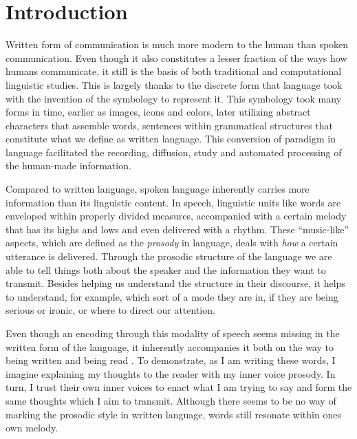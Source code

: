\chapter{Introduction}
\label{chapter:intro}

Written form of communication is much more modern to the human than spoken communication. Even though it also constitutes a lesser fraction of the ways how humans communicate, it still is the basis of both traditional and computational linguistic studies. This is largely thanks to the discrete form that language took with the invention of the symbology to represent it. This symbology took many forms in time, earlier as images, icons and colors, later utilizing abstract characters that assemble words, sentences within grammatical structures that constitute what we define as written language. This conversion of paradigm in language facilitated the recording, diffusion, study and automated processing of the human-made information. 

Compared to written language, spoken language inherently carries more information than its linguistic content. In speech, linguistic units like words are enveloped within properly divided measures, accompanied with a certain melody that has its highs and lows and even delivered with a rhythm. These ``music-like'' aspects, which are defined as the \textit{prosody} in language, deals with \textit{how} a certain utterance is delivered. Through the prosodic structure of the language we are able to tell things both about the speaker and the information they want to transmit. Besides helping us understand the structure in their discourse, it helps to understand, for example, which sort of a mode they are in, if they are being serious or ironic, or where to direct our attention. 

Even though an encoding through this modality of speech seems missing in the written form of the language, it inherently accompanies it both on the way to being written and being read \citep{wallace}. To demonstrate, as I am writing these words, I imagine explaining my thoughts to the reader with my inner voice prosody. In turn, I trust their own inner voices to enact what I am trying to say and form the same thoughts which I aim to transmit. Although there seems to be no way of marking the prosodic style in written language, words still resonate within ones own melody.

